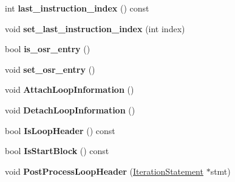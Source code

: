 \begin{DoxyCompactItemize}
\item 
int {\bfseries last\+\_\+instruction\+\_\+index} () const \hypertarget{classv8_1_1internal_1_1_h_basic_block_a0c2433ed998ba1594fba0322f47721a4}{}\label{classv8_1_1internal_1_1_h_basic_block_a0c2433ed998ba1594fba0322f47721a4}

\item 
void {\bfseries set\+\_\+last\+\_\+instruction\+\_\+index} (int index)\hypertarget{classv8_1_1internal_1_1_h_basic_block_aea363e2593b14442e6445ea83fc874db}{}\label{classv8_1_1internal_1_1_h_basic_block_aea363e2593b14442e6445ea83fc874db}

\item 
bool {\bfseries is\+\_\+osr\+\_\+entry} ()\hypertarget{classv8_1_1internal_1_1_h_basic_block_ac7fb53f5c10e650abcf286da75e80c52}{}\label{classv8_1_1internal_1_1_h_basic_block_ac7fb53f5c10e650abcf286da75e80c52}

\item 
void {\bfseries set\+\_\+osr\+\_\+entry} ()\hypertarget{classv8_1_1internal_1_1_h_basic_block_a61ecf1c00614117620cbbde94eda537e}{}\label{classv8_1_1internal_1_1_h_basic_block_a61ecf1c00614117620cbbde94eda537e}

\item 
void {\bfseries Attach\+Loop\+Information} ()\hypertarget{classv8_1_1internal_1_1_h_basic_block_a394402279bceb2a037fad93f6be22db5}{}\label{classv8_1_1internal_1_1_h_basic_block_a394402279bceb2a037fad93f6be22db5}

\item 
void {\bfseries Detach\+Loop\+Information} ()\hypertarget{classv8_1_1internal_1_1_h_basic_block_a02f37547ef557878c0c895e133ff6ee7}{}\label{classv8_1_1internal_1_1_h_basic_block_a02f37547ef557878c0c895e133ff6ee7}

\item 
bool {\bfseries Is\+Loop\+Header} () const \hypertarget{classv8_1_1internal_1_1_h_basic_block_af8b1e9e0b1a85a50939a0da96d4683f6}{}\label{classv8_1_1internal_1_1_h_basic_block_af8b1e9e0b1a85a50939a0da96d4683f6}

\item 
bool {\bfseries Is\+Start\+Block} () const \hypertarget{classv8_1_1internal_1_1_h_basic_block_a5c3ea32372263dd2b6e698314e2f6fba}{}\label{classv8_1_1internal_1_1_h_basic_block_a5c3ea32372263dd2b6e698314e2f6fba}

\item 
void {\bfseries Post\+Process\+Loop\+Header} (\hyperlink{classv8_1_1internal_1_1_iteration_statement}{Iteration\+Statement} $\ast$stmt)\hypertarget{classv8_1_1internal_1_1_h_basic_block_a4f08373872a43c262b33990ffee19204}{}\label{classv8_1_1internal_1_1_h_basic_block_a4f08373872a43c262b33990ffee19204}


\end{DoxyCompactItemize}
